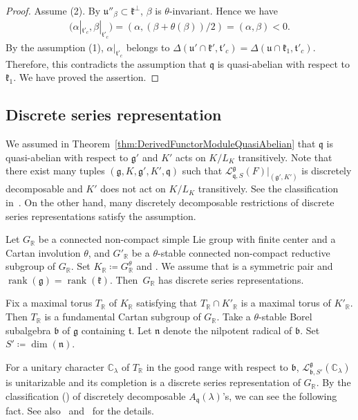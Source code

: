 \documentclass[10pt,a4paper]{amsart}
\numberwithin{equation}{section}
\theoremstyle{definition}
\newcommand{\BasicRing}[1]{\mathbb{#1}}
\newcommand{\RR}{\BasicRing{R}}
\newcommand{\CC}{\BasicRing{C}}
\DeclareMathOperator{\rank}{rank}
\newcommand{\lie}[1]{\mathfrak{#1}}
\newcommand{\lmod}[3]{\mathcal{L}^{\lie{#1}}_{\lie{#2}, #3}}
\begin{document}
\begin{proof}
	Assume (2).
	By $\lie{u}''_{\beta} \subset \lie{k}^{\perp}$, $\beta$ is $\theta$-invariant.
	Hence we have
	\begin{align*}
	\bigl(\alpha|_{\lie{t}'_{c}}, \beta|_{\lie{t}'_{c}}\bigr) = (\alpha, (\beta + \theta(\beta)) / 2) = (\alpha, \beta) < 0. %
	\end{align*}
	By the assumption (1), $\alpha|_{\lie{t}'_{c}}$ belongs to $\Delta(\lie{u}'\cap \lie{k'}, \lie{t}'_{c}) = \Delta(\lie{u}\cap \lie{k}_1, \lie{t}'_c)$.
	Therefore, this contradicts the assumption that $\lie{q}$ is quasi-abelian with respect to $\lie{k}_1$.
	We have proved the assertion.
\end{proof}

\subsection{Discrete series representation}

We assumed in Theorem~\ref{thm:DerivedFunctorModuleQuasiAbelian} that $\lie{q}$ is quasi-abelian with respect to $\lie{g}'$ and $K'$ acts on $K/L_K$ transitively.
Note that there exist many tuples $(\lie{g}, K, \lie{g'}, K', \lie{q})$ such that $\lmod{g}{q}{S}(F)|_{(\lie{g}', K')}$ is discretely decomposable and $K'$ does not act on $K/L_K$ transitively.
See the classification in~\cite{KoOs12}.
On the other hand, many discretely decomposable restrictions of discrete series representations satisfy the assumption.

Let $G_\RR$ be a connected non-compact simple Lie group with finite center and a Cartan involution $\theta$,
and $G'_{\RR}$ be a $\theta$-stable connected non-compact reductive subgroup of $G_{\RR}$.
Set $K_{\RR}\coloneq G^{\theta}_{\RR}$ and \smash{$K'_{\RR}\coloneq \bigl(G'_{\RR}\bigr)^{\theta}$}.
We assume that \smash{$\bigl(G_{\RR}, G'_{\RR}\bigr)$} is a symmetric pair and $\rank(\lie{g}) = \rank(\lie{k})$.
Then~$G_\RR$ has discrete series representations.

Fix a maximal torus $T_{\RR}$ of $K_{\RR}$ satisfying that $T_{\RR} \cap K'_{\RR}$ is a maximal torus of $K'_{\RR}$.
Then $T_{\RR}$ is a fundamental Cartan subgroup of $G_{\RR}$.
Take a $\theta$-stable Borel subalgebra $\lie{b}$ of $\lie{g}$ containing $\lie{t}$.
Let $\lie{n}$ denote the nilpotent radical of $\lie{b}$.
Set $S'\coloneq \dim(\lie{n})$.

For a unitary character $\CC_{\lambda}$ of $T_{\RR}$ in the good range with respect to $\lie{b}$,
$\lmod{g}{b}{S'}(\CC_{\lambda})$ is unitarizable and its completion is a discrete series representation of $G_{\RR}$.
By the classification (\cite{KoOs12}) of discretely decomposable $A_{\lie{q}}(\lambda)$'s,
we can see the following fact.
See also~\cite{DuVa10} and~\cite[Section 8]{Os24} for the details.
\end{document}
